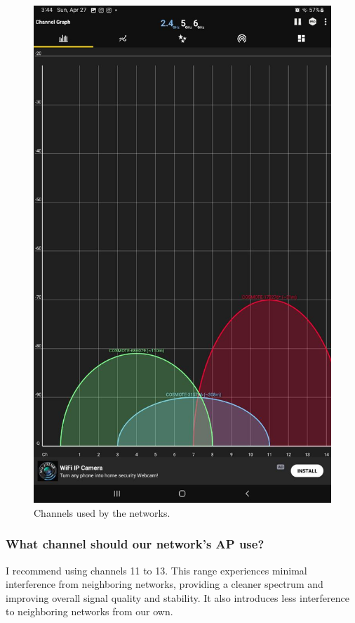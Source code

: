 \documentclass{article}
\begin{document}
\begin{figure}[H]
    \centering
    \includegraphics[width=1\linewidth]{images/channels_used_far.jpg}
    \caption{Channels used by the networks.}
    \label{fig:channels-used-far}
\end{figure}

\subsubsection{What channel should our network's AP use?}

I recommend using channels 11 to 13.
This range experiences minimal interference from neighboring networks, providing a cleaner spectrum and improving overall signal quality and stability. It also introduces less interference to neighboring networks from our own.
\end{document}
